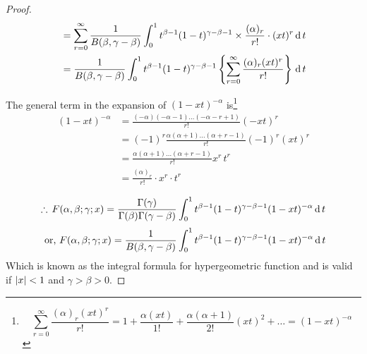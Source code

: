 \documentclass[../main-sheet.tex]{subfiles}
\begin{document}
\begin{proof}
\begin{align*}
        &=\sum_{r=0}^\infty\frac{1}{B(\beta,\gamma-\beta)}\int_0^1 t^{\beta-1}(1-t)^{\gamma-\beta-1}\times\frac{(\alpha)_r}{r!}\cdot (xt)^r\,\mathrm{d}\, t\\
        &=\frac{1}{B(\beta,\gamma-\beta)}\int_0^1 t^{\beta-1}(1-t)^{\gamma-\beta-1}\left\{ \sum_{r=0}^\infty\frac{(\alpha)_r (xt)^r}{r!}\right\}\,\mathrm{d}\, t\\
    \end{align*}
    \begin{note}
        The general term in the expansion of \( (1-xt)^{-\alpha} \) is\footnote{\[
            \sum_{r=0}^\infty\frac{(\alpha)_r (xt)^r}{r!}=1+\frac{\alpha(xt)}{1!}+\frac{\alpha(\alpha+1)}{2!}(xt)^2+\dots=(1-xt)^{-\alpha}
        \]} 
        \begin{align*}
            (1-xt)^{-\alpha}&=\frac{(-\alpha)(-\alpha-1)\dots(-\alpha-r+1)}{r!}(-xt)^r\\
            &=(-1)^r\frac{\alpha(\alpha+1)\dots(\alpha+r-1)}{r!}(-1)^r(xt)^r\\
            &=\frac{\alpha(\alpha+1)\dots(\alpha+r-1)}{r!}x^r\,t^r\\
            &=\frac{(\alpha)_r}{r!}\cdot x^r\cdot t^r
        \end{align*}
    \end{note}
    \[
        \therefore\,F(\alpha,\beta;\gamma;x)=\frac{\Gamma(\gamma)}{\Gamma(\beta)\Gamma(\gamma-\beta)}\int_0^1 t^{\beta-1}(1-t)^{\gamma-\beta-1}(1-xt)^{-\alpha}\,\mathrm{d}\, t
    \]
    \[
        \text{ or, }F(\alpha,\beta;\gamma;x)=\frac{1}{B(\beta,\gamma-\beta)}\int_0^1 t^{\beta-1}(1-t)^{\gamma-\beta-1}(1-xt)^{-\alpha}\,\mathrm{d}\, t
    \]
    Which is known as the integral formula for hypergeometric function and is valid if \( \left\vert x\right\vert<1 \) and \( \gamma>\beta>0 \).
\end{proof}
\end{document}

